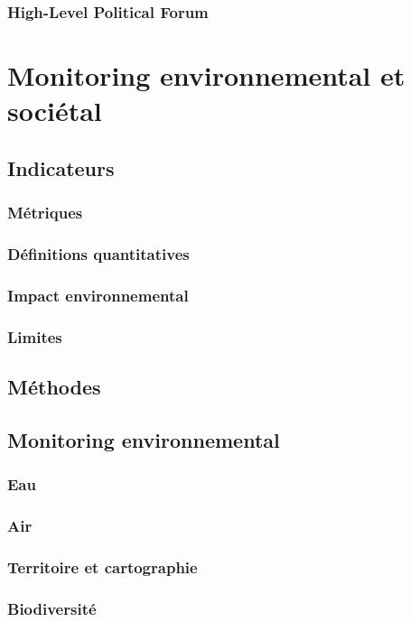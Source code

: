 \documentclass[10pt, conference, compsocconf]{llncs}
\begin{document}
\subsubsection{High-Level Political Forum}

\section{Monitoring environnemental et sociétal}
\subsection{Indicateurs}
\subsubsection{Métriques}
\subsubsection{Définitions quantitatives}
\subsubsection{Impact environnemental}			
\subsubsection{Limites}
\subsection{Méthodes}

\subsection{Monitoring environnemental}
\subsubsection{Eau}
\subsubsection{Air}
\subsubsection{Territoire et cartographie}
\subsubsection{Biodiversité}
\end{document}
